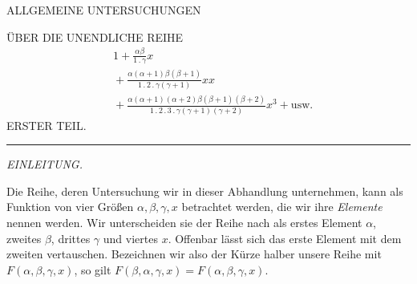 \clearpage{}
\begin{center}
ALLGEMEINE UNTERSUCHUNGEN

\medskip
ÜBER DIE UNENDLICHE REIHE
\[
\begin{aligned}&1+\frac{\alpha\beta}{1\mathbin{.}\gamma}x\\
&{}+\frac{\alpha(\alpha+1)\beta(\beta+1)}{1\mathbin{.}2\mathbin{.}\gamma(\gamma+1)}xx\\
&{}+\frac{\alpha(\alpha+1)(\alpha+2)\beta(\beta+1)(\beta+2)}{1\mathbin{.}2\mathbin{.}3\mathbin{.}\gamma(\gamma+1)(\gamma+2)}x^3+\mathrm{usw.}
\end{aligned}
\]
ERSTER TEIL.

\medskip
\rule{0.13\linewidth}{0.4pt}

\medskip
\textit{EINLEITUNG.}

\end{center}
Die Reihe, deren Untersuchung wir in dieser Abhandlung unternehmen, kann als Funktion von vier Größen $\alpha,\beta,\gamma,x$ betrachtet werden, die wir ihre \textit{Elemente} nennen werden. Wir unterscheiden sie der Reihe nach als erstes Element $\alpha$, zweites $\beta$, drittes $\gamma$ und viertes $x$. Offenbar lässt sich das erste Element mit dem zweiten vertauschen. Bezeichnen wir also der Kürze halber unsere Reihe mit $F(\alpha,\beta,\gamma,x)$, so gilt $F(\beta,\alpha,\gamma,x)=F(\alpha,\beta,\gamma,x)$.

